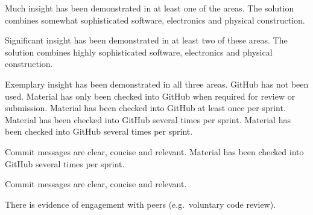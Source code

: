 \documentclass{../fal_assignment}
\begin{document}
\begin{markingrubric}
            \par Much insight has been demonstrated in at least one of the areas.
        \grade The solution combines somewhat sophisticated software, electronics and physical construction.
            \par Significant insight has been demonstrated in at least two of these areas.
        \grade The solution combines highly sophisticated software, electronics and physical construction.
            \par Exemplary insight has been demonstrated in all three areas.
        \grade\fail GitHub has not been used.
        \grade Material has only been checked into GitHub when required for review or submission.
        \grade Material has been checked into GitHub at least once per sprint.
        \grade Material has been checked into GitHub several times per sprint.
        \grade Material has been checked into GitHub several times per sprint.
            \par Commit messages are clear, concise and relevant.
        \grade Material has been checked into GitHub several times per sprint.
            \par Commit messages are clear, concise and relevant.
            \par There is evidence of engagement with peers (e.g.\ voluntary code review).
\end{markingrubric}
\end{document}
